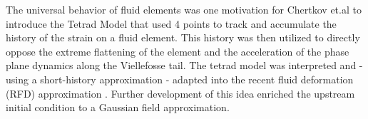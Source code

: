 The universal behavior of fluid elements was one motivation for Chertkov et.al to introduce the Tetrad Model\cite{chertkov1999} that used 4 points to track and accumulate the history of the strain on a fluid element. This history was then utilized to directly oppose the extreme flattening of the element and the acceleration of the phase plane dynamics along the Viellefosse tail. The tetrad model was interpreted and - using a short-history approximation - adapted into the recent fluid deformation (RFD) approximation \cite{chevillard2006lagrangian}.
Further development of this idea enriched the upstream initial condition to a Gaussian field approximation.

